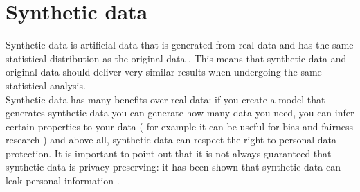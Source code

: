 \section{Synthetic data}
Synthetic data is artificial data that is generated from real data and has the same statistical distribution as the original data . This means that synthetic data and original data should deliver very similar results when undergoing the same statistical analysis. \\
Synthetic data has many benefits over real data: if you create a model that generates synthetic data you can generate how many data you need, you can infer certain properties to your data ( for example it can be useful for bias and fairness research ) and above all, synthetic data can respect the right to personal data protection. It is important to point out that it is not always guaranteed that synthetic data is privacy-preserving: it has been shown that synthetic data can leak personal information \cite{bellovin2019privacy}.\\

